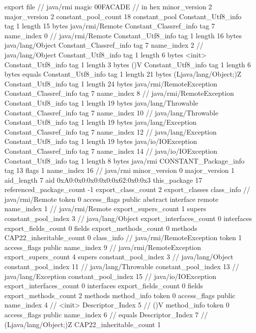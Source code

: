 export file {		// java/rmi
	magic	00FACADE		 // in hex
	minor_version	2
	major_version	2
	constant_pool_count	18
	constant_pool {
		Constant_Utf8_info {
			tag	1
			length	15
			bytes	java/rmi/Remote
		}
		Constant_Classref_info {
			tag	7
			name_index	0		// java/rmi/Remote
		}
		Constant_Utf8_info {
			tag	1
			length	16
			bytes	java/lang/Object
		}
		Constant_Classref_info {
			tag	7
			name_index	2		// java/lang/Object
		}
		Constant_Utf8_info {
			tag	1
			length	6
			bytes	<init>
		}
		Constant_Utf8_info {
			tag	1
			length	3
			bytes	()V
		}
		Constant_Utf8_info {
			tag	1
			length	6
			bytes	equals
		}
		Constant_Utf8_info {
			tag	1
			length	21
			bytes	(Ljava/lang/Object;)Z
		}
		Constant_Utf8_info {
			tag	1
			length	24
			bytes	java/rmi/RemoteException
		}
		Constant_Classref_info {
			tag	7
			name_index	8		// java/rmi/RemoteException
		}
		Constant_Utf8_info {
			tag	1
			length	19
			bytes	java/lang/Throwable
		}
		Constant_Classref_info {
			tag	7
			name_index	10		// java/lang/Throwable
		}
		Constant_Utf8_info {
			tag	1
			length	19
			bytes	java/lang/Exception
		}
		Constant_Classref_info {
			tag	7
			name_index	12		// java/lang/Exception
		}
		Constant_Utf8_info {
			tag	1
			length	19
			bytes	java/io/IOException
		}
		Constant_Classref_info {
			tag	7
			name_index	14		// java/io/IOException
		}
		Constant_Utf8_info {
			tag	1
			length	8
			bytes	java/rmi
		}
		CONSTANT_Package_info {
			tag	13
			flags	1
			name_index	16		// java/rmi
			minor_version	0
			major_version	1
			aid_length	7
			aid	0xA0:0x0:0x0:0x0:0x62:0x0:0x3
		}
	}
	this_package	17
	referenced_package_count	-1
	export_class_count	2
	export_classes {
		class_info {		// java/rmi/Remote
			token	0
			access_flags	public abstract interface remote
			name_index	1		// java/rmi/Remote
			export_supers_count	1
			supers {
				constant_pool_index	3		// java/lang/Object
			}
			export_interfaces_count	0
			interfaces {
			}
			export_fields_count	0
			fields {
			}
			export_methods_count	0
			methods {
			}
			CAP22_inheritable_count	0
		}
		class_info {		// java/rmi/RemoteException
			token	1
			access_flags	public
			name_index	9		// java/rmi/RemoteException
			export_supers_count	4
			supers {
				constant_pool_index	3		// java/lang/Object
				constant_pool_index	11		// java/lang/Throwable
				constant_pool_index	13		// java/lang/Exception
				constant_pool_index	15		// java/io/IOException
			}
			export_interfaces_count	0
			interfaces {
			}
			export_fields_count	0
			fields {
			}
			export_methods_count	2
			methods {
				method_info {
					token	0
					access_flags	public
					name_index	4		// <init>
					Descriptor_Index	5		// ()V
				}
				method_info {
					token	0
					access_flags	public
					name_index	6		// equals
					Descriptor_Index	7		// (Ljava/lang/Object;)Z
				}
			}
			CAP22_inheritable_count	1
		}
	}
}
